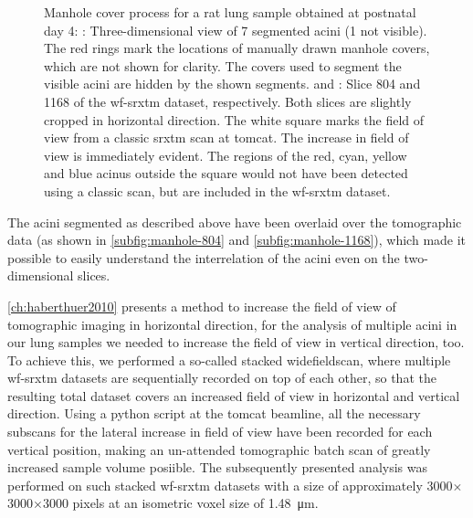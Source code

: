 \begin{figure}
{{%
			\label{subfig:manhole-1168}%
		}%
	}%
	\caption[Manhole cover process]{Manhole cover process for a rat lung sample obtained at postnatal day 4: : Three-dimensional view of 7 segmented acini (1 not visible). The red rings mark the locations of manually drawn manhole covers, which are not shown for clarity. The covers used to segment the visible acini are hidden by the shown segments.  and : Slice 804 and 1168 of the \ac{wf-srxtm} dataset, respectively. Both slices are slightly cropped in horizontal direction. The white square marks the field of view from a classic \ac{srxtm} scan at \ac{tomcat}. The increase in field of view is immediately evident. The regions of the red, cyan, yellow and blue acinus outside the square would not have been detected using a classic scan, but are included in the \ac{wf-srxtm} dataset.}
	\label{fig:manhole cover}%
\end{figure}%

The acini segmented as described above have been overlaid over the tomographic data (as shown in \autoref{subfig:manhole-804} and \ref{subfig:manhole-1168}), which made it possible to easily understand the interrelation of the acini even on the two-dimensional slices. 

\autoref{ch:haberthuer2010} presents a method to increase the field of view of tomographic imaging in horizontal direction, for the analysis of multiple acini in our lung samples we needed to increase the field of view in vertical direction, too. To achieve this, we performed a so-called stacked widefieldscan, where multiple \ac{wf-srxtm} datasets are sequentially recorded on top of each other, so that the resulting total dataset covers an increased field of view in horizontal and vertical direction. Using a python script at the \ac{tomcat} beamline, all the necessary subscans for the lateral increase in field of view have been recorded for each vertical position, making an un-attended tomographic batch scan of greatly increased sample volume posiible. The subsequently presented analysis was performed on such stacked \ac{wf-srxtm} datasets with a size of approximately 3000$\times$3000$\times$3000 pixels at an isometric voxel size of \SI{1.48}{\micro\meter}.

